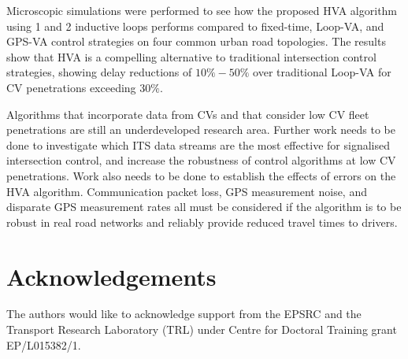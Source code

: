 \documentclass[numbered]{trbunofficial}
\begin{document}
Microscopic simulations were performed to see how the proposed HVA algorithm using 1 and 2 inductive loops performs compared to fixed-time, Loop-VA,  and GPS-VA control strategies on four common urban road topologies. 
The results show that HVA is a compelling alternative to traditional intersection control strategies, showing delay reductions of $10\%-50\%$ over traditional Loop-VA for CV penetrations exceeding $30\%$.

Algorithms that incorporate data from CVs and that consider low CV fleet penetrations are still an underdeveloped research area. Further work needs to be done to investigate which ITS data streams are the most effective for signalised intersection control, and increase the robustness of control algorithms at low CV penetrations. Work also needs to be done to establish the effects of errors on the HVA algorithm. Communication packet loss, GPS measurement noise, and disparate GPS measurement rates all must be considered if the algorithm is to be robust in real road networks and reliably provide reduced travel times to drivers.

\section{Acknowledgements}
The authors would like to acknowledge support from the EPSRC and the Transport Research Laboratory (TRL) under Centre for Doctoral Training grant EP/L015382/1.

\newpage



\end{document}
